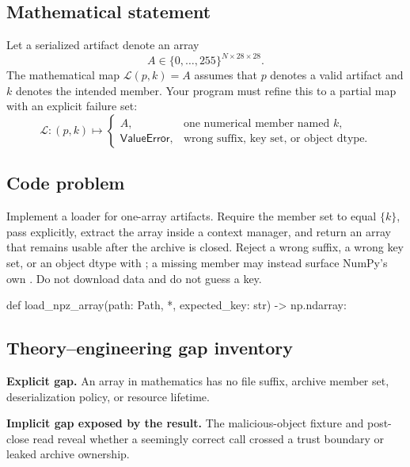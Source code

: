 
        \subsection{Mathematical statement}


Let a serialized artifact denote an array
\[
  A \in \{0,\ldots,255\}^{N\times 28\times 28}.
\]
The mathematical map $\mathcal{L}(p,k)=A$ assumes that $p$ denotes a valid
artifact and $k$ denotes the intended member.  Your program must refine this to
a partial map with an explicit failure set:
\[
  \mathcal{L}: (p,k) \longmapsto
  \begin{cases}
    A, & \text{one numerical member named }k,\\
    \mathsf{ValueError}, & \text{wrong suffix, key set, or object dtype.}
  \end{cases}
\]


        \subsection{Code problem}


Implement a loader for one-array  artifacts.  Require the member set
to equal $\{k\}$, pass  explicitly, extract the array
inside a context manager, and return an array that remains
usable after the archive is closed.  Reject a wrong suffix, a wrong key set,
or an object dtype with ; a missing member may instead
surface NumPy's own .  Do not download data and do not guess a key.


        \begin{contractbox}
        \begin{Code}
        def load_npz_array(path: Path, *, expected_key: str) -> np.ndarray:
        \end{Code}
        \end{contractbox}

        \subsection{Theory--engineering gap inventory}

        \begin{gapbox}
        \textbf{Explicit gap.} An array in mathematics has no file suffix, archive member set, deserialization policy, or resource lifetime.

        \textbf{Implicit gap exposed by the result.} The malicious-object fixture and post-close read reveal whether a seemingly correct  call crossed a trust boundary or leaked archive ownership.
        \end{gapbox}

